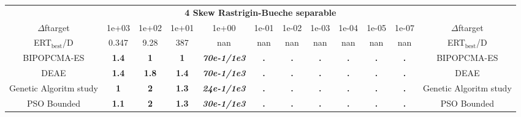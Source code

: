 \begin{tabular}{cccccccccccc}
 & \multicolumn{10}{c}{{\normalsize \textbf{4 Skew Rastrigin-Bueche separable}}}\\
$\Delta$ftarget& 1e+03& 1e+02& 1e+01& 1e+00& 1e-01& 1e-02& 1e-03& 1e-04& 1e-05& 1e-07 & $\Delta$ftarget \\
ERT$_{\textrm{best}}$/D& 0.347& 9.28& 387& nan& nan& nan& nan& nan& nan& nan & ERT$_{\textrm{best}}$/D \\
\hline
BIPOPCMA-ES & \textbf{1.4} & \textbf{1} & \textbf{1} & \textbf{\textit{70e-1}\textit{/1e3}} & \textbf{.} & \textbf{.} & \textbf{.} & \textbf{.} & \textbf{.} & \textbf{.} & BIPOPCMA-ES \cite{add_an_entry_for_BIPOPCMA-ES_in_bbob.bib}\\
DEAE & \textbf{1.4} & \textbf{1.8} & \textbf{1.4} & \textbf{\textit{70e-1}\textit{/1e3}} & \textbf{.} & \textbf{.} & \textbf{.} & \textbf{.} & \textbf{.} & \textbf{.} & DEAE \cite{add_an_entry_for_DEAE_in_bbob.bib}\\
Genetic Algoritm study & \textbf{1} & \textbf{2} & \textbf{1.3} & \textbf{\textit{24e-1}\textit{/1e3}} & \textbf{.} & \textbf{.} & \textbf{.} & \textbf{.} & \textbf{.} & \textbf{.} & Genetic Algoritm study \cite{add_an_entry_for_Genetic Algoritm study_in_bbob.bib}\\
PSO Bounded & \textbf{1.1} & \textbf{2} & \textbf{1.3} & \textbf{\textit{30e-1}\textit{/1e3}} & \textbf{.} & \textbf{.} & \textbf{.} & \textbf{.} & \textbf{.} & \textbf{.} & PSO Bounded \cite{add_an_entry_for_PSO Bounded_in_bbob.bib}
\end{tabular}
